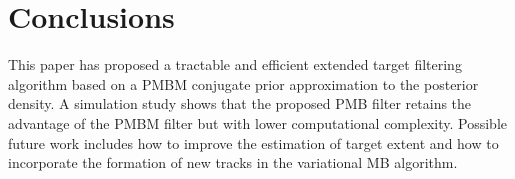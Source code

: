 \documentclass[conference]{IEEEtran}
\begin{document}
\section{Conclusions}
This paper has proposed a tractable and efficient extended target filtering algorithm based on a PMBM conjugate prior approximation to the posterior density. A simulation study shows that the proposed PMB filter retains the advantage of the PMBM filter but with lower computational complexity. Possible future work includes how to improve the estimation of target extent and how to incorporate the formation of new tracks in the variational MB algorithm. 




\end{document}
